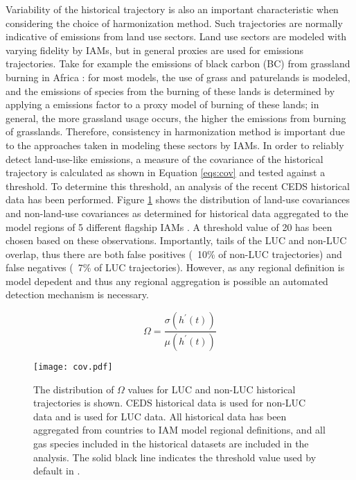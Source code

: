 Variability of the historical trajectory is also an important characteristic
when considering the choice of harmonization method. Such trajectories are
normally indicative of emissions from land use sectors. Land use sectors are
modeled with varying fidelity by IAMs, but in general proxies are used for
emissions trajectories. Take for example the emissions of black carbon (BC) from
grassland burning in Africa : for most
models, the use of grass and paturelands is modeled, and the emissions of
species from the burning of these lands is determined by applying a emissions
factor to a proxy model of burning of these lands; in general, the more
grassland usage occurs, the higher the emissions from burning of
grasslands. Therefore, consistency in harmonization method is important due to
the approaches taken in modeling these sectors by IAMs. In order to reliably
detect land-use-like emissions, a measure of the covariance of the historical
trajectory is calculated as shown in Equation \ref{eqs:cov} and tested against a
threshold. To determine this threshold, an analysis of the recent CEDS
 historical data has been performed. Figure \ref{fig:cov}
shows the distribution of land-use covariances and non-land-use covariances as
determined for historical data aggregated to the model regions of 5 different
flagship IAMs . A threshold value of 20 has been chosen
based on these observations. Importantly, tails of the LUC and non-LUC overlap,
thus there are both false positives (~10\% of non-LUC trajectories) and false
negatives (~7\% of LUC trajectories). However, as any regional definition is
model depedent and thus any regional aggregation is possible an automated
detection mechanism is necessary.

\begin{equation}\label{eqs:cov}
    \Omega =  \frac{\sigma(h^{\prime}(t))}{\mu(h^{\prime}(t))}
\end{equation}


\begin{figure}
  \begin{center}
    \texttt{[image: cov.pdf]}
    \caption[]{
      \label{fig:cov}
      The distribution of $\Omega$ values for LUC and non-LUC historical
      trajectories is shown. CEDS historical data is used for non-LUC data and
       is used for LUC data. All historical data has been
      aggregated from countries to IAM model regional definitions, and all gas
      species included in the historical datasets are included in the
      analysis. The solid black line indicates the threshold value used by
      default in .  
    }
  \end{center}
\end{figure}

